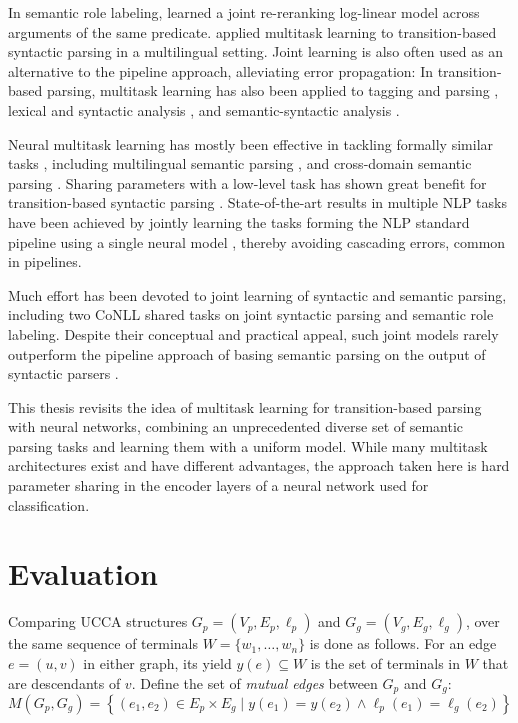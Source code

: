 \documentclass[12pt,a4paper,table]{report}
\renewcommand\cite{\citep}      %
\begin{document}
In semantic role labeling, \citet{toutanova2005joint}
learned a joint re-reranking log-linear model across arguments of the same predicate.
\citet{Q16-1031,guo2016exploiting} applied multitask learning to transition-based
syntactic parsing in a multilingual setting.
Joint learning is also often used
as an alternative to the pipeline approach, alleviating error propagation:
In transition-based parsing, multitask learning has also been applied to
tagging and parsing \cite{bohnet2012transition,Zhang2016StackpropagationIR},
lexical and syntactic analysis \cite{constant-nivre:2016:P16-1,more2016joint},
and semantic-syntactic analysis \cite{swayamdipta-EtAl:2016:CoNLL,henderson2013multilingual}.

Neural multitask learning has mostly been effective in tackling formally similar
tasks \citep{P16-2038},
including multilingual semantic parsing \citep{duong2017multilingual},
and cross-domain semantic parsing \citep{herzig-berant:2017:Short,W17-2607}.
Sharing parameters with a low-level task
has shown great benefit for transition-based syntactic parsing
\citep{bohnet2012transition,Zhang2016StackpropagationIR,constant-nivre:2016:P16-1,more2016joint}.
State-of-the-art results in multiple NLP tasks have been achieved
by jointly learning the tasks forming the NLP standard pipeline using 
a single neural model \citep{collobert2011natural,D17-1206},
thereby avoiding cascading errors, common in pipelines.

Much effort has been devoted to joint learning of syntactic
and semantic parsing, including
two CoNLL shared tasks \cite{surdeanu2008conll,hajivc2009conll}
on joint syntactic parsing and semantic role labeling.
Despite their conceptual and practical appeal, such joint models rarely outperform
the pipeline approach of basing semantic parsing on the output of syntactic parsers
\cite{lluis2008joint,henderson2013multilingual,D15-1169,swayamdipta-EtAl:2016:CoNLL,swayamdipta2017frame}.

This thesis revisits the idea of multitask learning for transition-based parsing
with neural networks, combining an unprecedented diverse set of semantic parsing
tasks and learning them with a uniform model.
While many multitask architectures exist and have different advantages,
the approach taken here is hard parameter sharing in the encoder layers of a neural
network used for classification.

\section{Evaluation}
Comparing UCCA structures
$G_p=(V_p,E_p,\ell_p)$ and $G_g=(V_g,E_g,\ell_g)$,
over the same sequence of terminals $W = \{w_1,\ldots,w_n\}$
is done as follows.
For an edge $e=(u,v)$ in either graph, its yield $y(e) \subseteq W$ is the
set of terminals in $W$ that are descendants of $v$.
Define the set of \textit{mutual edges} between $G_p$ and $G_g$:
\[
    M(G_p,G_g) =
    \left\{(e_1,e_2) \in E_p \times E_g \;|\;
    y(e_1) = y(e_2) \wedge \ell_p(e_1)=\ell_g(e_2)\right\}
\]
\end{document}

